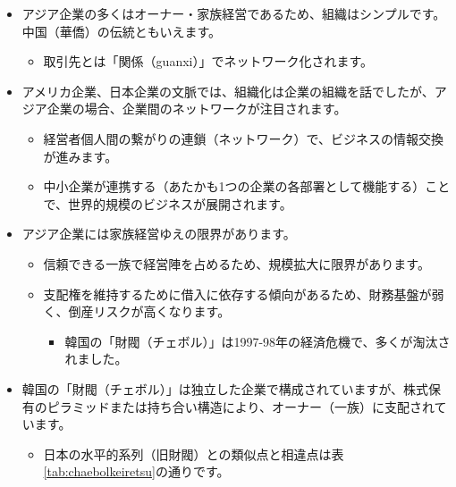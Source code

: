 \documentclass[
]{book}
\providecommand{\tightlist}{%
  \setlength{\itemsep}{0pt}\setlength{\parskip}{0pt}}
\begin{document}
\begin{itemize}
\item
  アジア企業の多くはオーナー・家族経営であるため、組織はシンプルです。中国（華僑）の伝統ともいえます。

  \begin{itemize}
  \tightlist
  \item
    取引先とは「関係（guanxi）」でネットワーク化されます。
  \end{itemize}
\item
  アメリカ企業、日本企業の文脈では、組織化は企業の組織を話でしたが、アジア企業の場合、企業間のネットワークが注目されます。

  \begin{itemize}
  \item
    経営者個人間の繋がりの連鎖（ネットワーク）で、ビジネスの情報交換が進みます。
  \item
    中小企業が連携する（あたかも1つの企業の各部署として機能する）ことで、世界的規模のビジネスが展開されます。
  \end{itemize}
\item
  アジア企業には家族経営ゆえの限界があります。

  \begin{itemize}
  \item
    信頼できる一族で経営陣を占めるため、規模拡大に限界があります。
  \item
    支配権を維持するために借入に依存する傾向があるため、財務基盤が弱く、倒産リスクが高くなります。

    \begin{itemize}
    \tightlist
    \item
      韓国の「財閥（チェボル）」は1997-98年の経済危機で、多くが淘汰されました。
    \end{itemize}
  \end{itemize}
\item
  韓国の「財閥（チェボル）」は独立した企業で構成されていますが、株式保有のピラミッドまたは持ち合い構造により、オーナー（一族）に支配されています。

  \begin{itemize}
  \tightlist
  \item
    日本の水平的系列（旧財閥）との類似点と相違点は表\ref{tab:chaebolkeiretsu}の通りです。
  \end{itemize}
\end{itemize}
\end{document}
